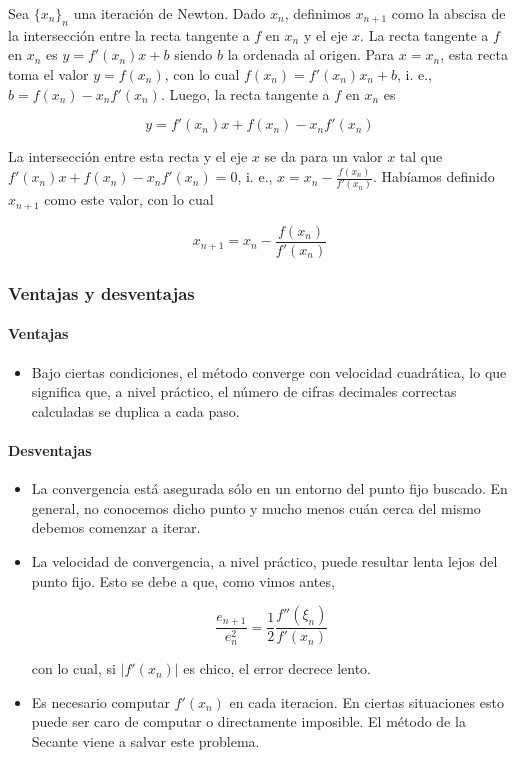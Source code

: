 Sea $\{x_n\}_n$ una iteración de Newton. Dado $x_n$, definimos $x_{n + 1}$ como la abscisa de la intersección entre la recta tangente a $f$ en $x_n$ y el eje $x$. La recta tangente a $f$ en $x_n$ es $y = f'(x_n)x + b$ siendo $b$ la ordenada al origen. Para $x = x_n$, esta recta toma el valor $y = f(x_n)$, con lo cual $f(x_n) = f'(x_n) x_n + b$, i. e., $b = f(x_n) - x_n f'(x_n)$. Luego, la recta tangente a $f$ en $x_n$ es

\[y = f'(x_n)x + f(x_n) - x_n f'(x_n)\]

La intersección entre esta recta y el eje $x$ se da para un valor $x$ tal que $f'(x_n) x + f(x_n) - x_n f'(x_n) = 0$, i. e., $x = x_n - \frac{f(x_n)}{f'(x_{n})}$. Habíamos definido $x_{n + 1}$ como este valor, con lo cual

\[x_{n + 1} = x_n - \frac{f(x_n)}{f'(x_{n})}\]

\subsubsection{Ventajas y desventajas}

\paragraph{Ventajas}
\begin{itemize}
\item Bajo ciertas condiciones, el método converge con velocidad cuadrática, lo que significa que, a nivel práctico, el número de cifras decimales correctas calculadas se duplica a cada paso.
\end{itemize}

\paragraph{Desventajas}
\begin{itemize}
\item La convergencia está asegurada sólo en un entorno del punto fijo buscado. En general, no conocemos dicho punto y mucho menos cuán cerca del mismo debemos comenzar a iterar.

\item La velocidad de convergencia, a nivel práctico, puede resultar lenta lejos del punto fijo. Esto se debe a que, como vimos antes,

\[\frac{e_{n + 1}}{e_n^2} = \frac{1}{2} \frac{f''(\xi_n)}{f'(x_n)}\]

con lo cual, si $|f'(x_n)|$ es chico, el error decrece lento.

\item Es necesario computar $f'(x_n)$ en cada iteracion. En ciertas situaciones esto puede ser caro de computar o directamente imposible. El método de la Secante viene a salvar este problema.
\end{itemize}

